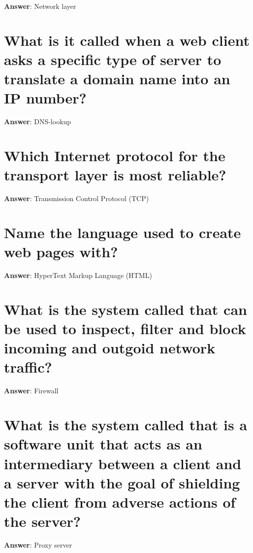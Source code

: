 \documentclass[a4paper,11pt,oneside]{book}
\begin{document}
\begin{sloppypar}
\label{q:24:sa:en:True}

\textbf{Answer}: Network layer



\section{What is it called when a web client asks a specific type of server to translate a domain name into an IP number?}

\label{q:25:sa:en:True}

\textbf{Answer}: DNS-lookup



\section{Which Internet protocol for the transport layer is most reliable?}

\label{q:26:sa:en:True}

\textbf{Answer}: Transmission Control Protocol (TCP)



\section{Name the language used to create web pages with?}

\label{q:27:sa:en:True}

\textbf{Answer}: HyperText Markup Language (HTML)



\section{What is the system called that can be used to inspect, filter and block incoming and outgoid network traffic?}

\label{q:28:sa:en:True}

\textbf{Answer}: Firewall



\section{What is the system called that is a software unit that acts as an intermediary between a client and a server with the goal of shielding the client from adverse actions of the server?}

\label{q:29:sa:en:True}

\textbf{Answer}: Proxy server




\end{sloppypar}
\end{document}
